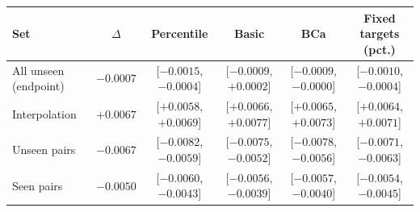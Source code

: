 \setlength{\tabcolsep}{3pt}
\begin{tabular}{lccccc}
\toprule
Set & $\Delta$ & Percentile & Basic & BCa & Fixed targets (pct.) \\
\midrule
All unseen (endpoint) & $-0.0007$ & [$-0.0015$, $-0.0004$] & [$-0.0009$, $+0.0002$] & [$-0.0009$, $-0.0000$] & [$-0.0010$, $-0.0004$] \\
Interpolation & $+0.0067$ & [$+0.0058$, $+0.0069$] & [$+0.0066$, $+0.0077$] & [$+0.0065$, $+0.0073$] & [$+0.0064$, $+0.0071$] \\
Unseen pairs & $-0.0067$ & [$-0.0082$, $-0.0059$] & [$-0.0075$, $-0.0052$] & [$-0.0078$, $-0.0056$] & [$-0.0071$, $-0.0063$] \\
Seen pairs & $-0.0050$ & [$-0.0060$, $-0.0043$] & [$-0.0056$, $-0.0039$] & [$-0.0057$, $-0.0040$] & [$-0.0054$, $-0.0045$] \\
\bottomrule
\end{tabular}
